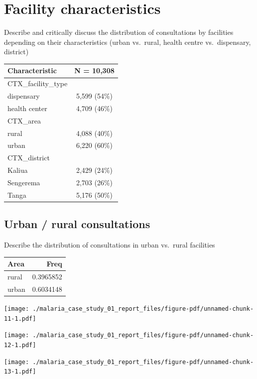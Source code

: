 \documentclass[
  letterpaper,
  DIV=11,
  numbers=noendperiod,
  oneside]{scrreprt}
\begin{document}
\hypertarget{facility-characteristics}{%
\section{Facility characteristics}\label{facility-characteristics}}

Describe and critically discuss the distribution of consultations by
facilities depending on their characteristics (urban vs.~rural, health
centre vs.~dispensary, district)

\begin{longtable}[]{@{}lc@{}}
\toprule()
\textbf{Characteristic} & \textbf{N = 10,308} \\
\midrule()
\endhead
CTX\_facility\_type & \\
dispensary & 5,599 (54\%) \\
health center & 4,709 (46\%) \\
CTX\_area & \\
rural & 4,088 (40\%) \\
urban & 6,220 (60\%) \\
CTX\_district & \\
Kaliua & 2,429 (24\%) \\
Sengerema & 2,703 (26\%) \\
Tanga & 5,176 (50\%) \\
\bottomrule()
\end{longtable}

\hypertarget{urban-rural-consultations}{%
\subsection{Urban / rural
consultations}\label{urban-rural-consultations}}

Describe the distribution of consultations in urban vs.~rural facilities

\begin{longtable}[]{@{}lr@{}}
\toprule()
Area & Freq \\
\midrule()
\endhead
rural & 0.3965852 \\
urban & 0.6034148 \\
\bottomrule()
\end{longtable}

\texttt{[image: ./malaria\_case\_study\_01\_report\_files/figure-pdf/unnamed-chunk-11-1.pdf]}

\texttt{[image: ./malaria\_case\_study\_01\_report\_files/figure-pdf/unnamed-chunk-12-1.pdf]}

\texttt{[image: ./malaria\_case\_study\_01\_report\_files/figure-pdf/unnamed-chunk-13-1.pdf]}
\end{document}
